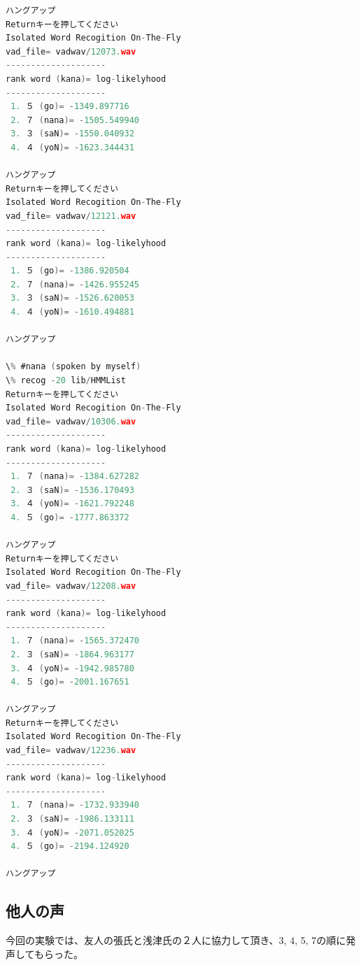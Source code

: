 \documentclass[11pt,a4paper, uplatex]{jsarticle}
\begin{document}
\begin{lstlisting}[language=c, caption=\texttt{recog}実行結果]
ハングアップ   
Returnキーを押してください
Isolated Word Recogition On-The-Fly
vad_file= vadwav/12073.wav
--------------------
rank word (kana)= log-likelyhood
--------------------
 1. ５ (go)= -1349.897716
 2. ７ (nana)= -1505.549940
 3. ３ (saN)= -1550.040932
 4. ４ (yoN)= -1623.344431

ハングアップ   
Returnキーを押してください
Isolated Word Recogition On-The-Fly
vad_file= vadwav/12121.wav
--------------------
rank word (kana)= log-likelyhood
--------------------
 1. ５ (go)= -1386.920504
 2. ７ (nana)= -1426.955245
 3. ３ (saN)= -1526.620053
 4. ４ (yoN)= -1610.494881

ハングアップ   

\% #nana (spoken by myself)
\% recog -20 lib/HMMList
Returnキーを押してください
Isolated Word Recogition On-The-Fly
vad_file= vadwav/10306.wav
--------------------
rank word (kana)= log-likelyhood
--------------------
 1. ７ (nana)= -1384.627282
 2. ３ (saN)= -1536.170493
 3. ４ (yoN)= -1621.792248
 4. ５ (go)= -1777.863372

ハングアップ   
Returnキーを押してください
Isolated Word Recogition On-The-Fly
vad_file= vadwav/12208.wav
--------------------
rank word (kana)= log-likelyhood
--------------------
 1. ７ (nana)= -1565.372470
 2. ３ (saN)= -1864.963177
 3. ４ (yoN)= -1942.985780
 4. ５ (go)= -2001.167651

ハングアップ   
Returnキーを押してください
Isolated Word Recogition On-The-Fly
vad_file= vadwav/12236.wav
--------------------
rank word (kana)= log-likelyhood
--------------------
 1. ７ (nana)= -1732.933940
 2. ３ (saN)= -1986.133111
 3. ４ (yoN)= -2071.052025
 4. ５ (go)= -2194.124920

ハングアップ   
\end{lstlisting}

\subsection{他人の声}
今回の実験では、友人の張氏と浅津氏の２人に協力して頂き、3, 4, 5, 7の順に発声してもらった。
\end{document}
